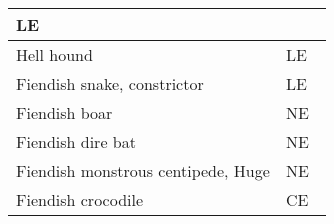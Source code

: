 \begin{longtable}{llll}
{\begin{minipage}[t]{0.601in}
LE\end{minipage}}\\
\hline
\multicolumn{1}{|p{3.326in}|}{\begin{minipage}[t]{3.326in}\raggedright
Hell hound\end{minipage}} & \multicolumn{3}{p{0.601in}|}{\begin{minipage}[t]{0.601in}\raggedright
LE\end{minipage}}\\
\hline
\multicolumn{1}{|p{3.326in}|}{\begin{minipage}[t]{3.326in}\raggedright
Fiendish snake, constrictor \end{minipage}} & \multicolumn{3}{p{0.601in}|}{\begin{minipage}[t]{0.601in}\raggedright
LE\end{minipage}}\\
\hline
\multicolumn{1}{|p{3.326in}|}{\begin{minipage}[t]{3.326in}\raggedright
Fiendish boar\end{minipage}} & \multicolumn{3}{p{0.601in}|}{\begin{minipage}[t]{0.601in}\raggedright
NE\end{minipage}}\\
\hline
\multicolumn{1}{|p{3.326in}|}{\begin{minipage}[t]{3.326in}\raggedright
Fiendish dire bat\end{minipage}} & \multicolumn{3}{p{0.601in}|}{\begin{minipage}[t]{0.601in}\raggedright
NE\end{minipage}}\\
\hline
\multicolumn{1}{|p{3.326in}|}{\begin{minipage}[t]{3.326in}\raggedright
Fiendish monstrous centipede, Huge\end{minipage}} & \multicolumn{3}{p{0.601in}|}{\begin{minipage}[t]{0.601in}\raggedright
NE\end{minipage}}\\
\hline
\multicolumn{1}{|p{3.326in}|}{\begin{minipage}[t]{3.326in}\raggedright
Fiendish crocodile\end{minipage}} & \multicolumn{3}{p{0.601in}|}{\begin{minipage}[t]{0.601in}\raggedright
CE\end{minipage}}\\
\hline

\end{longtable}
